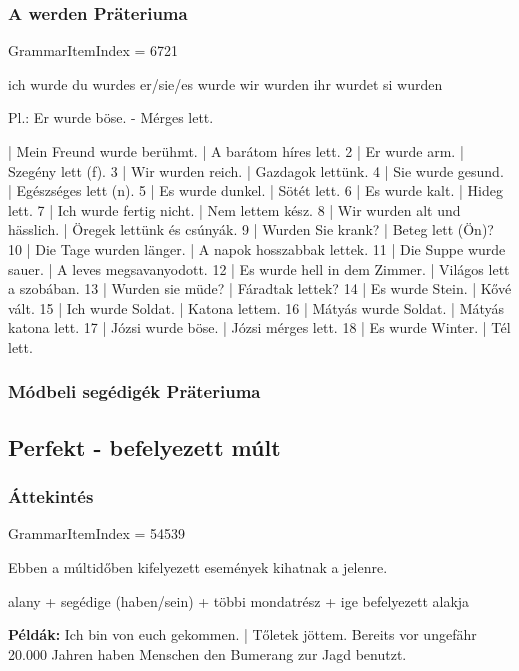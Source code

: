 \documentclass{article}
\newenvironment{desc}{\verbatim}{\endverbatim}
\newenvironment{exmp}{\verbatim}{\endverbatim}
\begin{document}
\subsubsection{A werden Präteriuma}

GrammarItemIndex = 6721

\begin{desc}
ich wurde
du wurdes
er/sie/es wurde
wir wurden
ihr wurdet
si wurden

Pl.: Er wurde böse. - Mérges lett.
\end{desc}

\begin{exmp}
1 | Mein Freund wurde berühmt. | A barátom híres lett.
2 | Er wurde arm. | Szegény lett (f).
3 | Wir wurden reich. | Gazdagok lettünk.
4 | Sie wurde gesund. | Egészséges lett (n).
5 | Es wurde dunkel. | Sötét lett.
6 | Es wurde kalt. | Hideg lett.
7 | Ich wurde fertig nicht. | Nem lettem kész.
8 | Wir wurden alt und hässlich. | Öregek lettünk és csúnyák.
9 | Wurden Sie krank? | Beteg lett (Ön)?
10 | Die Tage wurden länger. | A napok hosszabbak lettek.
11 | Die Suppe wurde sauer. | A leves megsavanyodott.
12 | Es wurde hell in dem Zimmer. | Világos lett a szobában.
13 | Wurden sie müde? | Fáradtak lettek?
14 | Es wurde Stein. | Kővé vált.
15 | Ich wurde Soldat. | Katona lettem.
16 | Mátyás wurde Soldat. | Mátyás katona lett.
17 | Józsi wurde böse. | Józsi mérges lett.
18 | Es wurde Winter. | Tél lett.
\end{exmp}

\subsubsection{Módbeli segédigék Präteriuma}

\subsection{Perfekt - befelyezett múlt}

\subsubsection{Áttekintés}

GrammarItemIndex = 54539

\begin{desc}
Ebben a múltidőben kifelyezett események kihatnak a jelenre.
\begin{center}
alany + segédige (haben/sein) + többi mondatrész + ige befelyezett alakja
\end{center}

\textbf{Példák:} Ich bin von euch gekommen. | Tőletek jöttem.
Bereits vor ungefähr 20.000 Jahren haben Menschen den Bumerang zur Jagd benutzt.
\end{desc}
\end{document}
